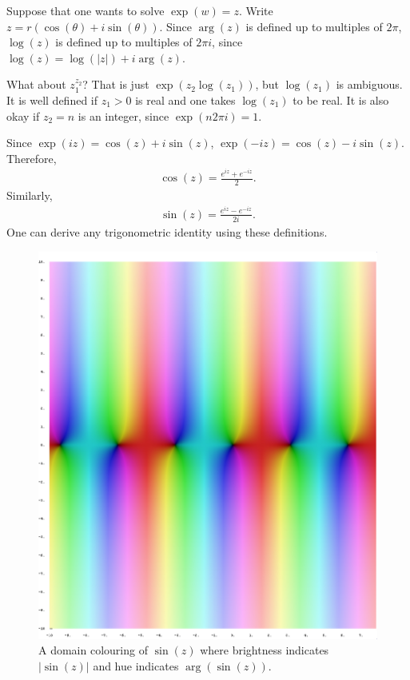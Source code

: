 \documentclass[11pt, oneside,margin=1in]{article}
\begin{document}
Suppose that one wants to solve $\exp (w) = z$. Write $z = r(\cos(\theta) + i\sin(\theta))$. Since $\arg (z)$ is defined up to multiples of $2\pi$, $\log (z)$ is defined up to multiples of $2\pi i$, since $\log (z) = \log( \left\lvert z \right\rvert) + i\arg (z)$. 

What about $z_1^{z_2}$? That is just $\exp(z_2\log (z_1))$, but $\log (z_1)$ is ambiguous. It is well defined if $z_1>0$ is real and one takes $\log (z_1)$ to be real. It is also okay if $z_2=n$ is an integer, since $\exp(n 2\pi i)=1$.

Since $\exp (iz) = \cos (z) + i\sin (z)$, $\exp (-iz)=\cos (z) - i\sin (z)$. Therefore,
\begin{align*}
	\cos (z) = \frac{e^{iz}+ e^{-iz}}{2}.
\end{align*}
Similarly,
\begin{align*}
	\sin (z) = \frac{e^{iz}-e^{-iz}}{2i}.
\end{align*}
One can derive any trigonometric identity using these definitions.
 \begin{figure}
	 \begin{center}
	 	\includegraphics[scale=0.2]{sin_z}
		\caption{A domain colouring of $\sin (z)$ where brightness indicates $\left\lvert \sin (z) \right\rvert $ and hue indicates $\arg(\sin (z))$.}
	 \end{center}
\end{figure}
\end{document}
